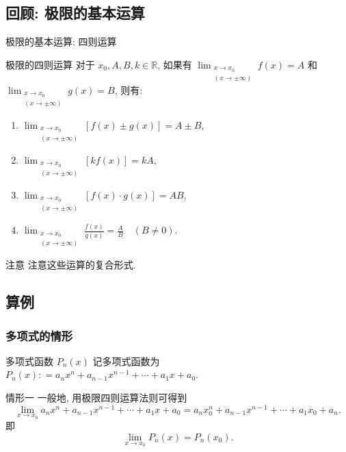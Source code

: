 \documentclass[
10pt,  
aspectratio=43,  
]{beamer}
\begin{document}
\subsection{回顾: 极限的基本运算}
\begin{frame}[c]{极限的基本运算: 四则运算}
\begin{block}{极限的四则运算}
对于 $x_0,  A,  B,  k \in \mathbb{R}$,  如果有 $\lim _{\substack{x \rightarrow x_0 \\(x \rightarrow \pm\infty)}} f(x)=A$ 和 $ \lim _{\substack{x \rightarrow x_0 \\(x \rightarrow \pm\infty)}} g(x)=B$,   则有: 
\pause

\begin{enumerate}
\item $\lim _{\substack{x \rightarrow x_0 \\(x \rightarrow \pm\infty)}}[f(x) \pm g(x)]=A \pm B$,  \\
\pause
\item
 $\lim _{\substack{x \rightarrow x_0 \\(x \rightarrow \pm\infty)}}[k f(x)]=k A$,  \\
\pause
\item $\lim _{\substack{x \rightarrow x_0 \\(x \rightarrow\pm \infty)}}[f(x) \cdot g(x)]=A B$,  \\
\pause
\item $\lim _{\substack{x \rightarrow x_0 \\(x \rightarrow\pm \infty)}} \displaystyle\frac{f(x)}{g(x)}=\frac{A}{B} \quad(B \neq 0)$.
\end{enumerate}
\end{block}
\begin{exampleblock}{注意}
注意这些运算的复合形式.
\end{exampleblock}
\end{frame}

\subsection{算例}
\begin{frame}
\frametitle{多项式的情形}
\begin{block}{多项式函数 $P_n(x)$}
记多项式函数为 $P_n(x) : = a_n x^n+a_{n-1} x^{n-1}+\cdots+a_{1} x+a_0$.
\end{block}
\begin{exampleblock}{情形一}
一般地,   用极限四则运算法则可得到
$$
\lim _{x \rightarrow x_0}a_n x^n+a_{n-1} x^{n-1}+\cdots+a_{1} x+a_0=a_n x_0^n+a_{n-1} x^{n-1}+\cdots+a_{1} x_0+a_n.
$$
即
$$
\lim _{x \rightarrow x_0}P_n(x)=P_n(x_0).
$$
\end{exampleblock}

\end{frame}
\end{document}

